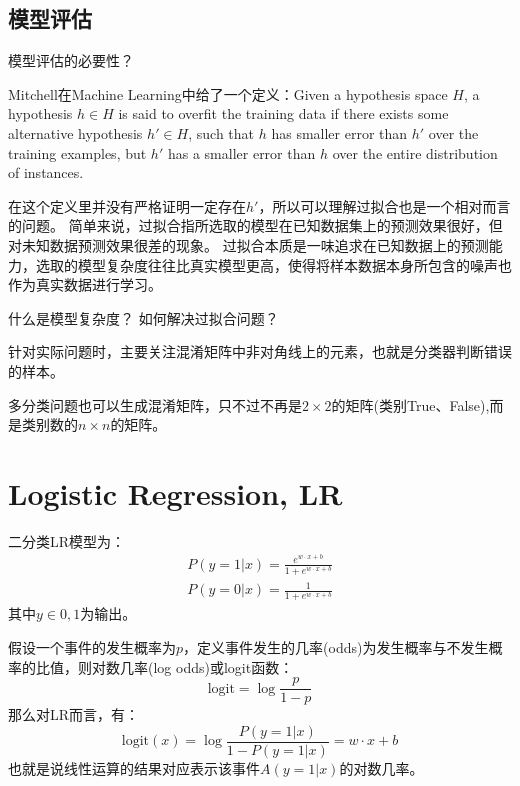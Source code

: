 \subsection{模型评估}
模型评估的必要性？

{}

Mitchell在Machine Learning中给了一个定义：Given a hypothesis space $H$, a hypothesis $h \in H$ 
is said to overfit the training data if there exists some alternative hypothesis $h' \in H$,
such that $h$ has smaller error than $h'$ over the training examples, but $h'$ has a smaller
error than $h$ over the entire distribution of instances.

在这个定义里并没有严格证明一定存在$h'$，所以可以理解过拟合也是一个相对而言的问题。
简单来说，过拟合指所选取的模型在已知数据集上的预测效果很好，但对未知数据预测效果很差的现象。
过拟合本质是一味追求在已知数据上的预测能力，选取的模型复杂度往往比真实模型更高，使得将样本数据本身所包含的噪声也作为真实数据进行学习。

什么是模型复杂度？
如何解决过拟合问题？

{}

针对实际问题时，主要关注混淆矩阵中非对角线上的元素，也就是分类器判断错误的样本。

多分类问题也可以生成混淆矩阵，只不过不再是$2 \times 2$的矩阵(类别True、False),而是类别数的$n \times n$的矩阵。

{}

\section{Logistic Regression, LR}
二分类LR模型为：
\begin{gather*}
    P(y=1|x) = \frac{e^{w\cdot x + b}}{1 + e^{w\cdot x + b}}\\
    P(y=0|x) = \frac{1}{1 + e^{w\cdot x + b}}
\end{gather*}
其中$y\in{0,1}$为输出。

假设一个事件的发生概率为$p$，定义事件发生的几率(odds)为发生概率与不发生概率的比值，则对数几率(log odds)或logit函数：
\begin{equation*}
    \text{logit} = \log \frac{p}{1-p}
\end{equation*}
那么对LR而言，有：
\begin{equation*}
    \text{logit}(x) = \log\frac{P(y=1|x)}{1-P({y=1|x})} = w\cdot x + b
\end{equation*}
也就是说线性运算的结果对应表示该事件$A(y=1|x)$的对数几率。

